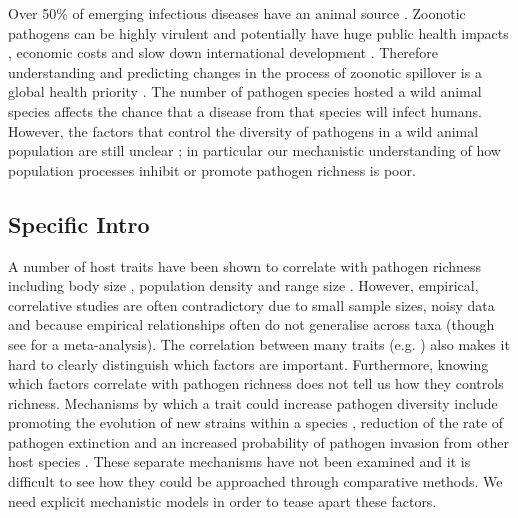 Over 50\% of emerging infectious diseases have an animal source \cite{jones2008global, smith2014global}.
Zoonotic pathogens can be highly virulent \cite{luby2009recurrent, lefebvre2014case} and potentially have huge public health impacts \cite{granich2015trends}, economic costs \cite{knobler2004learning} and slow down international development \cite{ebolaWorldbank}.
Therefore understanding and predicting changes in the process of zoonotic spillover is a global health priority \cite{taylor2001risk}.
The number of pathogen species hosted a wild animal species affects the chance that a disease from that species will infect humans.
However, the factors that control the diversity of pathogens in a wild animal population are still unclear \cite{metcalf2015five}; in particular our mechanistic understanding of how population processes inhibit or promote pathogen richness is poor.



\subsection{Specific Intro}



A number of host traits have been shown to correlate with pathogen richness including body size \cite{kamiya2014determines, arneberg2002host}, population density \cite{nunn2003comparative, arneberg2002host} and range size \cite{bordes2011impact, kamiya2014determines}.
However, empirical, correlative studies are often contradictory due to small sample sizes, noisy data and because empirical relationships often do not generalise across taxa (though see \cite{kamiya2014determines} for a meta-analysis).
The correlation between many traits (e.g. \textcite{nunn2015infectious}) also makes it hard to clearly distinguish which factors are important.
Furthermore, knowing which factors correlate with pathogen richness does not tell us how they controls richness. 
Mechanisms by which a trait could increase pathogen diversity include promoting the evolution of new strains within a species \cite{buckee2004effects}, reduction of the rate of pathogen extinction \cite{rand1995invasion} and an increased probability of pathogen invasion from other host species \cite{nunes2006localized}.
These separate mechanisms have not been examined and it is difficult to see how they could be approached through comparative methods.
We need explicit mechanistic models in order to tease apart these factors.

